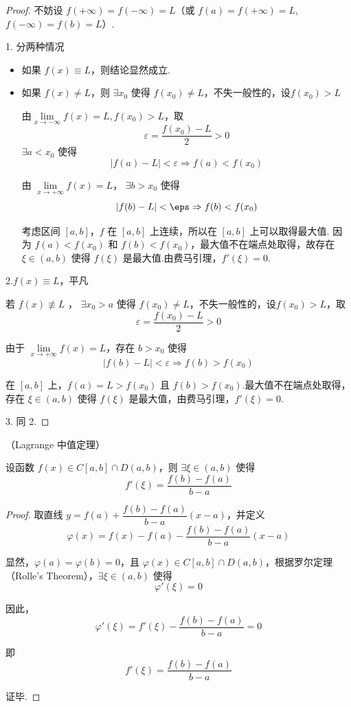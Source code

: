 \begin{proof}
	不妨设 \( f(+\infty) = f(-\infty) = L \)（或 \( f(a) = f(+\infty) = L \), \( f(-\infty) = f(b) = L \)）.
	
	1. 分两种情况
	\begin{itemize}
		\item 如果 \( f(x) \equiv L \)，则结论显然成立.
		\item 如果 \( f(x) \neq L \)，则 \(\exists x_0\) 使得 \( f(x_0) \neq L \)，不失一般性的，设$f(x_0)>L$
		
		由\( \lim\limits_{x \to -\infty} f(x) = L ,f(x_0)>L\)，取
		\[
		\varepsilon = \frac{f(x_0) - L}{2} > 0
		\]		
		\(\exists a < x_0\) 使得
		\[
		|f(a) - L| < \varepsilon \Rightarrow f(a) < f(x_0)
		\]
		
		由 \(\lim\limits_{x \to +\infty} f(x) = L\)， \(\exists b > x_0 \) 使得
		\[
		|f(b) - L| < \eps \Rightarrow f(b) < f(x_0)
		\]
		
		考虑区间 \([a, b]\)，\( f \) 在 \([a, b]\) 上连续，所以在 \([a, b]\) 上可以取得最大值.
		因为 \( f(a) < f(x_0) \) 和 \( f(b) < f(x_0) \)，最大值不在端点处取得，故存在 \( \xi \in (a, b) \) 使得 \( f(\xi) \) 是最大值.由费马引理，\( f'(\xi) = 0 \).
	\end{itemize}
	
	2.$f(x)\equiv L$，平凡 
	
	若 \( f(x) \not\equiv L \) ， \(\exists x_0>a \) 使得 \( f(x_0) \neq L \)，不失一般性的，设$f(x_0)>L$，取
	\[
	\varepsilon = \frac{ f(x_0)- L}{2} > 0
	\]
	
	由于 \( \lim\limits_{x \to +\infty} f(x) = L \)，存在 \( b > x_0 \) 使得
	\[
	|f(b) - L| < \varepsilon \Rightarrow f(b) > f(x_0)
	\]
	
	在 \([a, b]\) 上，\( f(a) = L > f(x_0) \) 且 \( f(b) > f(x_0) \).最大值不在端点处取得，存在 \( \xi \in (a, b) \) 使得 \( f(\xi) \) 是最大值，由费马引理，\( f'(\xi) = 0 \).
	
	3. 同 2.
\end{proof}
\begin{theorem}
	（Lagrange 中值定理）
	
	设函数 \( f(x) \in C[a, b] \cap D(a, b) \)，则 \(\exists \xi \in (a, b)\) 使得
	\[
	f'(\xi) = \frac{f(b) - f(a)}{b - a}
	\]
	
	
\end{theorem}
\begin{proof}
	
	
	取直线 \( y = f(a) + \dfrac{f(b) - f(a)}{b - a}(x - a) \)，并定义
	\[
	\varphi(x) = f(x) - f(a) - \frac{f(b) - f(a)}{b - a}(x - a)
	\]
	
	显然，\(\varphi(a) = \varphi(b) = 0\)，且 \(\varphi(x) \in C[a, b] \cap D(a, b)\)，根据罗尔定理（Rolle's Theorem），\(\exists \xi \in (a, b)\) 使得
	\[
	\varphi'(\xi) = 0
	\]
	
	因此，
	\[
	\varphi'(\xi) = f'(\xi) - \frac{f(b) - f(a)}{b - a} = 0
	\]
	
	即
	\[
	f'(\xi) = \frac{f(b) - f(a)}{b - a}
	\]
	
	证毕.
\end{proof}
